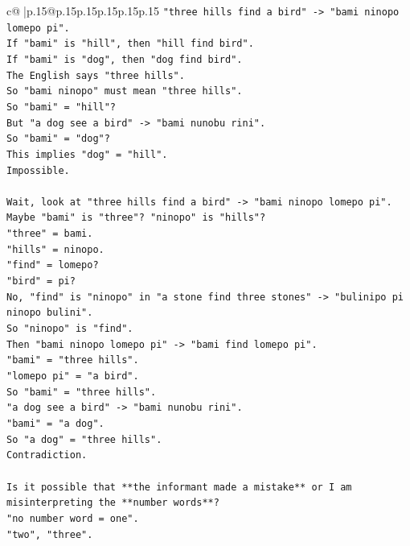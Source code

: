 \documentclass{article}
\begin{document}
{\begin{supertabular}{c@{$\;$}|p{.15\linewidth}@{}p{.15\linewidth}p{.15\linewidth}p{.15\linewidth}p{.15\linewidth}p{.15\linewidth}}
{{{\texttt{"three hills find a bird" {-}> "bami ninopo lomepo pi".} \\
\texttt{If "bami" is "hill", then "hill find bird".} \\
\texttt{If "bami" is "dog", then "dog find bird".} \\
\texttt{The English says "three hills".} \\
\texttt{So "bami ninopo" must mean "three hills".} \\
\texttt{So "bami" = "hill"?} \\
\texttt{But "a dog see a bird" {-}> "bami nunobu rini".} \\
\texttt{So "bami" = "dog"?} \\
\texttt{This implies "dog" = "hill".} \\
\texttt{Impossible.} \\
\\ 
\texttt{Wait, look at "three hills find a bird" {-}> "bami ninopo lomepo pi".} \\
\texttt{Maybe "bami" is "three"? "ninopo" is "hills"?} \\
\texttt{"three" = bami.} \\
\texttt{"hills" = ninopo.} \\
\texttt{"find" = lomepo?} \\
\texttt{"bird" = pi?} \\
\texttt{No, "find" is "ninopo" in "a stone find three stones" {-}> "bulinipo pi ninopo bulini".} \\
\texttt{So "ninopo" is "find".} \\
\texttt{Then "bami ninopo lomepo pi" {-}> "bami find lomepo pi".} \\
\texttt{"bami" = "three hills".} \\
\texttt{"lomepo pi" = "a bird".} \\
\texttt{So "bami" = "three hills".} \\
\texttt{"a dog see a bird" {-}> "bami nunobu rini".} \\
\texttt{"bami" = "a dog".} \\
\texttt{So "a dog" = "three hills".} \\
\texttt{Contradiction.} \\
\\ 
\texttt{Is it possible that **the informant made a mistake** or I am misinterpreting the **number words**?} \\
\texttt{"no number word = one".} \\
\texttt{"two", "three".} \\
}}}
\end{supertabular}}
\end{document}

